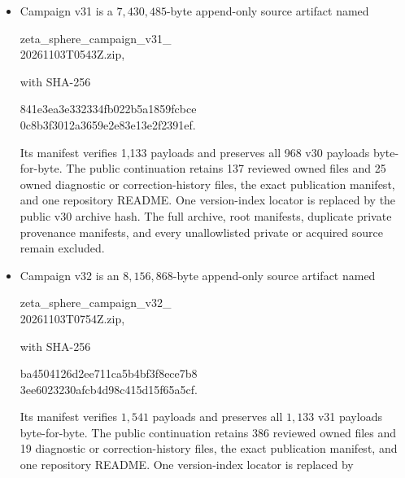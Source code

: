 \documentclass[11pt]{article}
\theoremstyle{definition}
\theoremstyle{remark}
\begin{document}
\begin{itemize}[leftmargin=2em]
with SHA-256
\begin{center}\small\ttfamily
f17d58c60d7dabaab7018ad38aa57c62\\
8748c7dc9ed2081c616332a95ace5cd6.
\end{center}
Its manifest verifies 968 payloads and preserves all 839 v26 payloads
byte-for-byte through the v27--v29 chain. The publication-safe continuation is
the deduplicated union of the explicit v27--v30 allowlists: 121 rows, 84 unique
authored files, and 37 same-hash carry-forwards. The repository retains those
84 files, the four exact publication manifests, and one repository-authored
README; six text files have documented privacy-only locator redactions.
\item Campaign v31 is a $7{,}430{,}485$-byte append-only source artifact named
\begin{center}\small\ttfamily
zeta\_sphere\_campaign\_v31\_\\
20261103T0543Z.zip,
\end{center}
with SHA-256
\begin{center}\small\ttfamily
841e3ea3e332334fb022b5a1859fcbce\\
0c8b3f3012a3659e2e83e13e2f2391ef.
\end{center}
Its manifest verifies 1,133 payloads and preserves all 968 v30 payloads
byte-for-byte. The public continuation retains 137 reviewed owned files and 25
owned diagnostic or correction-history files, the exact publication manifest,
and one repository README. One version-index locator is replaced by the public
v30 archive hash. The full archive, root manifests, duplicate private
provenance manifests, and every unallowlisted private or acquired source remain
excluded.
\item Campaign v32 is an $8{,}156{,}868$-byte append-only source artifact named
\begin{center}\small\ttfamily
zeta\_sphere\_campaign\_v32\_\\
20261103T0754Z.zip,
\end{center}
with SHA-256
\begin{center}\small\ttfamily
ba4504126d2ee711ca5b4bf3f8ece7b8\\
3ee6023230afcb4d98c415d15f65a5cf.
\end{center}
Its manifest verifies $1{,}541$ payloads and preserves all $1{,}133$ v31
payloads byte-for-byte. The public continuation retains 386 reviewed owned
files and 19 diagnostic or correction-history files, the exact publication
manifest, and one repository README. One version-index locator is replaced by

\end{itemize}
\end{document}
